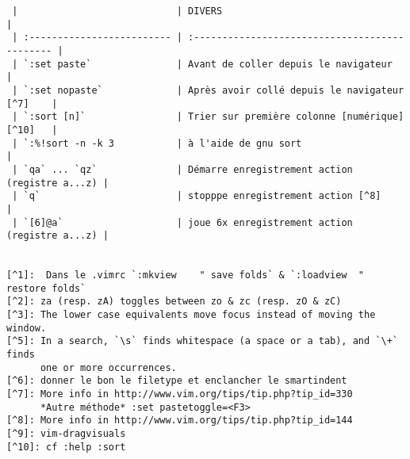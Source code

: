 \documentclass[10pt,landscape]{article}
\begin{document}
\begin{multicols}{2}
\begin{verbatim}
 |                            | DIVERS                                         |
 | :------------------------- | :--------------------------------------------- |
 | `:set paste`               | Avant de coller depuis le navigateur           |
 | `:set nopaste`             | Après avoir collé depuis le navigateur [^7]    |
 | `:sort [n]`                | Trier sur première colonne [numérique] [^10]   |
 | `:%!sort -n -k 3           | à l'aide de gnu sort                           |
 | `qa` ... `qz`              | Démarre enregistrement action (registre a...z) |
 | `q`                        | stopppe enregistrement action [^8]             |
 | `[6]@a`                    | joue 6x enregistrement action (registre a...z) |


[^1]:  Dans le .vimrc `:mkview    " save folds` & `:loadview  " restore folds`
[^2]: za (resp. zA) toggles between zo & zc (resp. zO & zC)
[^3]: The lower case equivalents move focus instead of moving the window.
[^5]: In a search, `\s` finds whitespace (a space or a tab), and `\+` finds 
      one or more occurrences.
[^6]: donner le bon le filetype et enclancher le smartindent
[^7]: More info in http://www.vim.org/tips/tip.php?tip_id=330 
      *Autre méthode* :set pastetoggle=<F3>
[^8]: More info in http://www.vim.org/tips/tip.php?tip_id=144
[^9]: vim-dragvisuals
[^10]: cf :help :sort

\end{verbatim}
\end{multicols}
\end{document}
